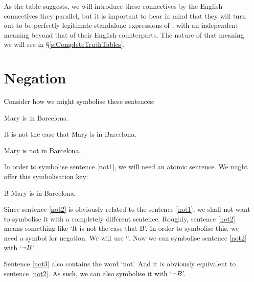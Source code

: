As the table suggests, we will introduce these connectives by the English connectives they parallel, but it is important to bear in mind that they will turn out to be perfectly legitimate standalone expressions of \TFL, with an independent meaning beyond that of their English counterparts. The nature of that meaning we will see in §\ref{s:CompleteTruthTables}.


\section{Negation}
Consider how we might symbolise these sentences:
	\begin{earg}
	\item[\ex{not1}] Mary is in Barcelona.
	\item[\ex{not2}] It is not the case that Mary is in Barcelona.
	\item[\ex{not3}] Mary is not in Barcelona.
	\end{earg}
In order to symbolise sentence \ref{not1}, we will need an atomic sentence. We might offer this symbolisation key:
	\begin{ekey}
		\item[B] Mary is in Barcelona.
	\end{ekey}
Since sentence \ref{not2} is obviously related to the sentence \ref{not1}, we shall not want to symbolise it with a completely different sentence. Roughly, sentence \ref{not2} means something like `It is not the case that B'. In order to symbolise this, we need a symbol for negation. We will use `\enot'. Now we can symbolise sentence \ref{not2} with `$\neg B$'. 

Sentence \ref{not3} also contains the word `not'. And it is obviously equivalent to sentence \ref{not2}. As such, we can also symbolise it with `$\neg B$'.

